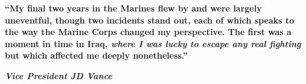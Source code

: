 \documentclass[a4paper,10pt]{memoir}
\begin{document}
\begin{vplace}[0.4]
  \begin{figure}[h]
    \centering
  \end{figure}
    
  \begin{center}
    \LARGE{\textbf{``My final two years in the Marines flew by and were largely
    uneventful, though two incidents stand out, each of which speaks to the
    way the Marine Corps changed my perspective. The first was a moment in time
    in Iraq, \textit{where I was lucky to escape any real fighting} but which
    affected me deeply nonetheless.''}}
  \end{center}

  \begin{flushright}
    \LARGE{\textbf{\textit{Vice President JD Vance}}}
  \end{flushright}
\end{vplace}
\end{document}
